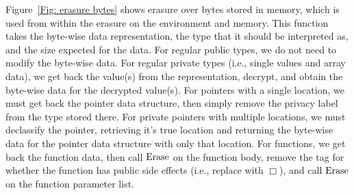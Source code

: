 Figure~\ref{Fig: erasure bytes} shows erasure over bytes stored in memory, which is used from within the erasure on the environment and memory. 
This function takes the byte-wise data representation, the type that it should be interpreted as, and the size expected for the data. 
For regular public types, we do not need to modify the byte-wise data. 
For regular private types (i.e., single values and array data), we get back the value(s) from the representation, decrypt, and obtain the byte-wise data for the decrypted value(s). 
For pointers with a single location, we must get back the pointer data structure, then simply remove the privacy label from the type stored there. 
For private pointers with multiple locations, we must declassify the pointer, retrieving it's true location and returning the byte-wise data for the pointer data structure with only that location. 
For functions, we get back the function data, then call $\mathrm{Erase}$ on the function body, remove the tag for whether the function has public side effects (i.e., replace with $\Box$), and call $\mathrm{Erase}$ on the function parameter list. 






